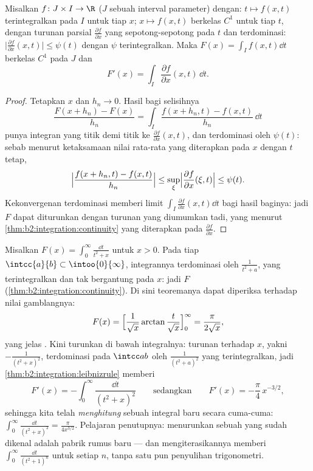 \begin{theorem}\label{thm:b2:integration:leibnizrule}
Misalkan $f \colon J \times I \to \R$ ($J$ sebuah interval parameter)
dengan: $t \mapsto f(x,t)$ terintegralkan pada $I$ untuk tiap $x$; $x
\mapsto f(x,t)$ berkelas $C^1$ untuk tiap $t$, dengan turunan parsial
$\frac{\partial f}{\partial x}$ yang  sepotong-sepotong pada $t$
dan terdominasi: $\bigl|\frac{\partial f}{\partial x}(x,t)\bigr| \leq
\psi(t)$ dengan $\psi$ terintegralkan. Maka $F(x) = \int_I f(x,t)\dd t$
berkelas $C^1$ pada $J$ dan
\[
F'(x) = \int_I \frac{\partial f}{\partial x}(x, t)\,\dd t .
\]
\end{theorem}

\begin{proof}
Tetapkan $x$ dan $h_n \to 0$. Hasil bagi selisihnya
\[
\frac{F(x + h_n) - F(x)}{h_n}
= \int_I \frac{f(x + h_n, t) - f(x, t)}{h_n}\,\dd t
\]
punya integran yang  titik demi titik ke $\frac{\partial
f}{\partial x}(x, t)$, dan terdominasi oleh $\psi(t)$: sebab menurut
ketaksamaan nilai rata-rata yang diterapkan pada $x$ dengan $t$ tetap,
\[
\Bigl|\frac{f(x + h_n, t) - f(x,t)}{h_n}\Bigr|
\leq \sup_{\xi} \Bigl|\frac{\partial f}{\partial x}(\xi, t)\Bigr|
\leq \psi(t) .
\]
Kekonvergenan terdominasi memberi limit $\int_I \frac{\partial
f}{\partial x}(x,t)\dd t$ bagi hasil baginya: jadi $F$ dapat diturunkan
dengan turunan yang diumumkan tadi, yang  menurut
\cref{thm:b2:integration:continuity} yang diterapkan pada
$\frac{\partial f}{\partial x}$.
\end{proof}

\begin{example}\label{ex:b2:integration:arctanparam}
Misalkan $F(x) = \displaystyle\int_0^\infty \frac{\dd t}{t^2 + x}$
untuk $x > 0$. Pada tiap $\intcc{a}{b} \subset \intoo{0}{\infty}$,
integrannya terdominasi oleh $\frac{1}{t^2 + a}$, yang terintegralkan
dan tak bergantung pada $x$: jadi $F$ 
(\cref{thm:b2:integration:continuity}). Di sini teoremanya dapat
diperiksa terhadap nilai gamblangnya:
\[
F(x) = \Bigl[\frac{1}{\sqrt x}\arctan\frac{t}{\sqrt
x}\Bigr]_0^\infty = \frac{\pi}{2\sqrt x} ,
\]
yang jelas . Kini turunkan di bawah integralnya: turunan
terhadap $x$, yakni $-\frac{1}{(t^2+x)^2}$, terdominasi pada
$\intcc ab$ oleh $\frac{1}{(t^2+a)^2}$ yang terintegralkan, jadi
\cref{thm:b2:integration:leibnizrule} memberi
\[
F'(x) = -\int_0^\infty \frac{\dd t}{(t^2 + x)^2}
\qquad\text{sedangkan}\qquad
F'(x) = -\frac{\pi}{4}\,x^{-3/2} ,
\]
sehingga kita telah \emph{menghitung} sebuah integral baru secara
cuma-cuma: $\int_0^\infty\frac{\dd t}{(t^2+x)^2} = \frac{\pi}{4x^{3/2}}$.
Pelajaran penutupnya: menurunkan sebuah  yang sudah
dikenal adalah pabrik rumus baru --- dan mengiterasikannya memberi
$\int_0^\infty\frac{\dd t}{(t^2+1)^n}$ untuk setiap $n$, tanpa satu pun
penyulihan trigonometri.
\end{example}

